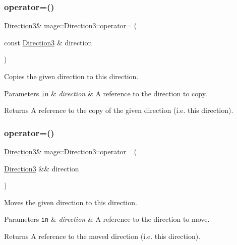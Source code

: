 \subsubsection{\texorpdfstring{operator=()}{operator=()}\hspace{0.1cm}{\footnotesize\ttfamily [1/2]}}
{\footnotesize\ttfamily \hyperlink{structmage_1_1_direction3}{Direction3}\& mage\+::\+Direction3\+::operator= (\begin{DoxyParamCaption}\item[{const \hyperlink{structmage_1_1_direction3}{Direction3} \&}]{direction }\end{DoxyParamCaption})}

Copies the given direction to this direction.


\begin{DoxyParams}[1]{Parameters}
\mbox{\tt in}  & {\em direction} & A reference to the direction to copy. \\
\hline
\end{DoxyParams}
\begin{DoxyReturn}{Returns}
A reference to the copy of the given direction (i.\+e. this direction). 
\end{DoxyReturn}
\hypertarget{structmage_1_1_direction3_aaf4d2b9927d99ab3b703c1e6e61a5f36}{}\label{structmage_1_1_direction3_aaf4d2b9927d99ab3b703c1e6e61a5f36} 
\subsubsection{\texorpdfstring{operator=()}{operator=()}\hspace{0.1cm}{\footnotesize\ttfamily [2/2]}}
{\footnotesize\ttfamily \hyperlink{structmage_1_1_direction3}{Direction3}\& mage\+::\+Direction3\+::operator= (\begin{DoxyParamCaption}\item[{\hyperlink{structmage_1_1_direction3}{Direction3} \&\&}]{direction }\end{DoxyParamCaption})}

Moves the given direction to this direction.


\begin{DoxyParams}[1]{Parameters}
\mbox{\tt in}  & {\em direction} & A reference to the direction to move. \\
\hline
\end{DoxyParams}
\begin{DoxyReturn}{Returns}
A reference to the moved direction (i.\+e. this direction). 
\end{DoxyReturn}
